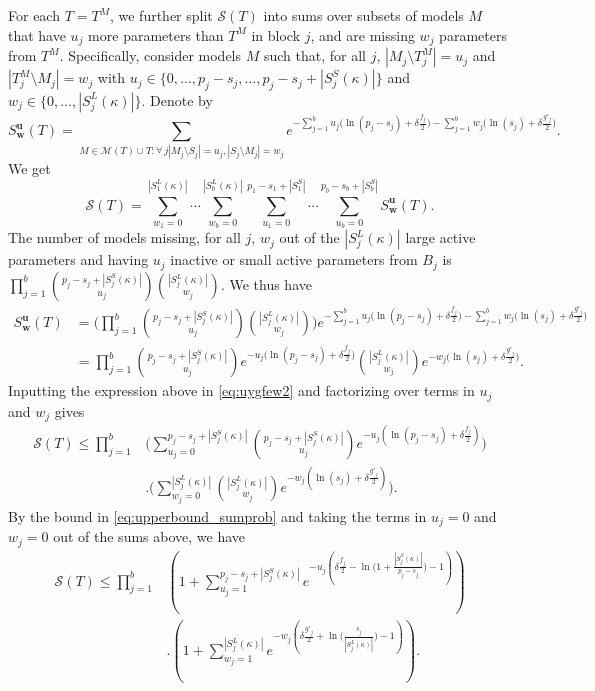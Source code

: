 \documentclass[bj,authoryear]{imsart}
\theoremstyle{plain}
\newcommand{\M}{\mathcal{M}}
\newcommand{\bs}{\boldsymbol}
\begin{document}
For each $T=T^M$, we further split $\mathcal{S}(T)$ into sums over subsets of models $M$ that have $u_j$ more parameters than $T^M$ in block $j$, and are missing $w_j$ parameters from $T^M$.
Specifically, consider models $M$ such that, for all $j$, $|M_j\setminus T^M_j|=u_j$ and $|T^M_j\setminus M_j|=w_j$ with $u_j \in \{0,\ldots,p_j-s_j,\ldots,p_j-s_j+|S_j^{S}(\kappa)|\}$ and $w_j \in \{0,\ldots,|S^{L}_j(\kappa)|\}$. Denote by
$$S^{\bs u}_{\bs w}(T)=\sum_{M \in \M(T) \cup T:\forall \,j |M_j\setminus S_j|=u_j, |S_j\setminus M_j|=w_j } e^{- \sum_{j=1}^b u_j\big(\ln(p_j-s_j)+\delta \tfrac{f_j}{2}\big)-\sum_{j=1}^b w_j\big(\ln(s_j)+\delta \tfrac{g'_j}{2}\big)}.$$
We get
\begin{equation}\label{eq:uygfew2}
    \mathcal{S}(T)=\sum_{w_1=0}^{|S^L_1(\kappa)|}\cdots\sum_{w_b=0}^{|S^L_b(\kappa)|}\sum_{u_1=0}^{p_1-s_1+|S_1^S|}\cdots\sum_{u_b=0}^{p_b-s_b+|S_b^S|}S^{\bs u}_{\bs w}(T).
\end{equation}
The number of models missing, for all $j$, $w_j$ out of the $|S^L_j(\kappa)|$ large active parameters and having $u_j$ inactive or small active parameters from $B_j$ is $\prod_{j=1}^b {\binom{p_j-s_j+|S^S_j(\kappa)|}{u_j}}{\binom{|S^L_j(\kappa)|}{w_j}}$. We thus have
\begin{align*}
    S^{\bs u}_{\bs w}(T)&= \bigg(\prod_{j=1}^b {\binom{p_j-s_j+|S^S_j(\kappa)|}{u_j}}{\binom{|S^L_j(\kappa)|}{w_j}}\bigg)e^{- \sum_{j=1}^b u_j\big(\ln(p_j-s_j)+\delta \tfrac{f_j}{2}\big)-\sum_{j=1}^b w_j\big(\ln(s_j)+\delta \tfrac{g'_j}{2}\big)} \\
    &= \prod_{j=1}^b {\binom{p_j-s_j+|S^S_j(\kappa)|}{u_j}}e^{- u_j\big(\ln(p_j-s_j)+\delta \tfrac{f_j}{2}\big)}{\binom{|S^L_j(\kappa)|}{w_j}}e^{-w_j\big(\ln(s_j)+\delta \tfrac{g'_j}{2}\big)}.
\end{align*}
Inputting the expression above in \eqref{eq:uygfew2} and factorizing over terms in $u_j$ and $w_j$ gives
\begin{align*}
    \mathcal{S}(T)\leq\prod_{j=1}^b & \Bigg(\sum_{u_j=0}^{p_j-s_j+|S^S_j(\kappa)|}{\binom{p_j-s_j+|S^S_j(\kappa)|}{u_j}}e^{- u_j(\ln(p_j-s_j)+\delta \tfrac{f_j}{2})}\Bigg)\\&.\Bigg(
    \sum_{w_j=0}^{|S^L_j(\kappa)|}{\binom{|S^L_j(\kappa)|}{w_j}}
    e^{-w_j(\ln(s_j)+\delta \tfrac{g'_j}{2})}\Bigg).
\end{align*}
By the bound in \eqref{eq:upperbound_sumprob} and taking the terms in $u_j=0$ and $w_j=0$ out of the sums above, %
we have
\begin{align}\label{eq:ogr}
    \mathcal{S}(T)\leq\prod_{j=1}^b & \left(1+\sum_{u_j=1}^{p_j-s_j+|S_j^{S}(\kappa)|}e^{-u_j\left(\delta \tfrac{f_j}{2}-\ln\big(1+\frac{|S^{S}_j(\kappa)|}{p_j-s_j}\big)-1\right)}\right)\\&.\left(1+
    \sum_{w_j=1}^{|S_j^{L}(\kappa)|}    e^{-w_j\left(\delta \tfrac{g'_j}{2}+\ln\big(\frac{s_j}{|S_j^{L}(\kappa)|}\big)-1\right)}\right).\nonumber
\end{align}
\end{document}
